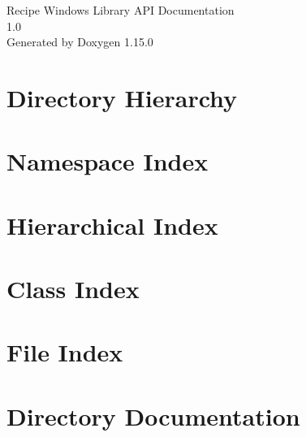 \documentclass[twoside]{book}
\newcommand{\+}{\discretionary{\mbox{\scriptsize$\hookleftarrow$}}{}{}}
\newcommand{\clearemptydoublepage}{%
    \newpage{\pagestyle{empty}\cleardoublepage}%
  }
\begin{document}
  \raggedbottom
    \hypersetup{pageanchor=false,
                bookmarksnumbered=true,
                pdfencoding=unicode
               }
  \begin{titlepage}
  \vspace*{7cm}
  \begin{center}%
  {\Large Recipe Windows Library API Documentation}\\
  [1ex]\large 1.\+0 \\
  \vspace*{1cm}
  {\large Generated by Doxygen 1.15.0}\\
  \end{center}
  \end{titlepage}
  \clearemptydoublepage
  \tableofcontents
  \clearemptydoublepage
  \hypersetup{pageanchor=true}

\chapter{Directory Hierarchy}

\chapter{Namespace Index}

\chapter{Hierarchical Index}

\chapter{Class Index}

\chapter{File Index}

\chapter{Directory Documentation}














\end{document}
